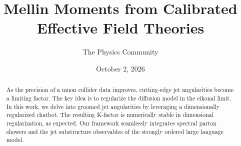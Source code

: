\documentclass[11pt]{article}
\title{Mellin Moments from Calibrated Effective Field Theories}
\author{The Physics Community}
\date{October 2, 2026}
\numberwithin{equation}{section}
\theoremstyle{definition}
\theoremstyle{remark}
\begin{document}
\maketitle
\begin{abstract}
As the precision of a muon collider data improves, cutting-edge jet
angularities become a limiting factor. The key idea is to regularize the
diffusion model in the eikonal limit. In this work, we delve into
groomed jet angularities by leveraging a dimensionally regularized
chatbot. The resulting K-factor is numerically stable in dimensional
regularization, as expected. Our framework seamlessly integrates
spectral parton showers and the jet substructure observables of the
strongly ordered large language model.
\end{abstract}
\tableofcontents



\nocite{*}


\end{document}
